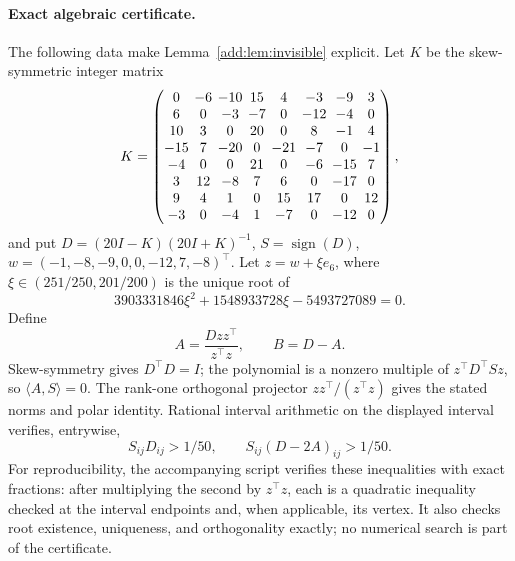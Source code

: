 \paragraph{Exact algebraic certificate.}
The following data make Lemma~\ref{add:lem:invisible} explicit.
Let $K$ be the skew-symmetric integer matrix
\[
\setlength{\arraycolsep}{2pt}
K=\begin{pmatrix}
0&-6&-10&15&4&-3&-9&3\\
6&0&-3&-7&0&-12&-4&0\\
10&3&0&20&0&8&-1&4\\
-15&7&-20&0&-21&-7&0&-1\\
-4&0&0&21&0&-6&-15&7\\
3&12&-8&7&6&0&-17&0\\
9&4&1&0&15&17&0&12\\
-3&0&-4&1&-7&0&-12&0
\end{pmatrix},
\]
and put $D=(20I-K)(20I+K)^{-1}$, $S=\operatorname{sign}(D)$,
$w=(-1,-8,-9,0,0,-12,7,-8)^\top$.
Let $z=w+\xi e_6$, where $\xi\in(251/250,201/200)$ is the unique root of
\[
3903331846\xi^2+1548933728\xi-5493727089=0.
\]
Define
\[
 A=\frac{Dzz^\top}{z^\top z},\qquad B=D-A.
\]
Skew-symmetry gives $D^\top D=I$; the polynomial is a nonzero
multiple of $z^\top D^\top Sz$, so $\langle A,S\rangle=0$.
The rank-one orthogonal projector $zz^\top/(z^\top z)$ gives the stated
norms and polar identity. Rational interval arithmetic on the displayed
interval verifies, entrywise,
\[
 S_{ij}D_{ij}>1/50,\qquad S_{ij}(D-2A)_{ij}>1/50.
\]
For reproducibility, the accompanying script
 verifies these
inequalities with exact fractions: after multiplying the second by
$z^\top z$, each is a quadratic inequality checked at the interval
endpoints and, when applicable, its vertex. It also checks root existence,
uniqueness, and orthogonality exactly; no numerical search is part of the
certificate.
